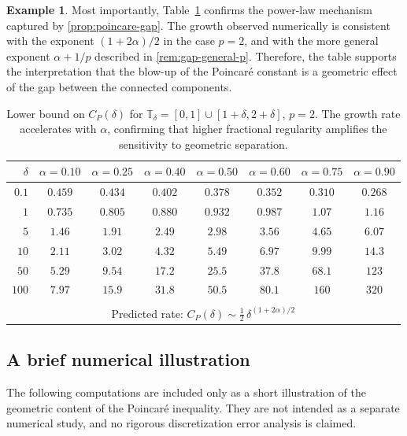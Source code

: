\documentclass[11pt,a4paper]{article}
\numberwithin{equation}{section}
\theoremstyle{definition}
\newtheorem{example}[example]{Example}
\newcommand{\T}{\mathbb{T}}
\begin{document}
\begin{example}
Most importantly, Table~\ref{tab:poincare} confirms the power-law mechanism captured by \cref{prop:poincare-gap}. The growth observed numerically is consistent with the exponent \((1+2\alpha)/2\) in the case \(p=2\), and with the more general exponent \(\alpha+1/p\) described in \cref{rem:gap-general-p}. Therefore, the table supports the interpretation that the blow-up of the Poincar\'e constant is a geometric effect of the gap between the connected components.
\begin{table}[ht]
\centering
\renewcommand{\arraystretch}{1.15}
\begin{tabular}{r|ccccccc}
\hline
$\delta$
& $\alpha\!=\!0.10$
& $\alpha\!=\!0.25$
& $\alpha\!=\!0.40$
& $\alpha\!=\!0.50$
& $\alpha\!=\!0.60$
& $\alpha\!=\!0.75$
& $\alpha\!=\!0.90$ \\
\hline
$0.1$   & $0.459$ & $0.434$ & $0.402$ & $0.378$
        & $0.352$ & $0.310$ & $0.268$ \\
$1$     & $0.735$ & $0.805$ & $0.880$ & $0.932$
        & $0.987$ & $1.07$ & $1.16$ \\
$5$     & $1.46$ & $1.91$ & $2.49$ & $2.98$
        & $3.56$ & $4.65$ & $6.07$ \\
$10$    & $2.11$ & $3.02$ & $4.32$ & $5.49$
        & $6.97$ & $9.99$ & $14.3$ \\
$50$    & $5.29$ & $9.54$ & $17.2$ & $25.5$
        & $37.8$ & $68.1$ & $123$  \\
$100$   & $7.97$ & $15.9$ & $31.8$ & $50.5$
        & $80.1$ & $160$ & $320$  \\
\hline
\\[-6pt]
\multicolumn{8}{c}{\footnotesize
Predicted rate:
$C_P(\delta)\sim\tfrac12\,\delta^{(1+2\alpha)/2}$} \\
\hline
\end{tabular}
\caption{Lower bound on $C_P(\delta)$ for
$\T_\delta=[0,1]\cup[1+\delta,2+\delta]$, $p=2$.
The growth rate accelerates with $\alpha$, confirming
that higher fractional regularity amplifies the
sensitivity to geometric separation.}
\label{tab:poincare}
\end{table}
\end{example}


\subsection{A brief numerical illustration}
\label{subsec:numerical}

The following computations are included only as a short illustration of the geometric content of the Poincar\'e inequality. They are not intended as a separate numerical study, and no rigorous discretization error analysis is claimed.
\end{document}
